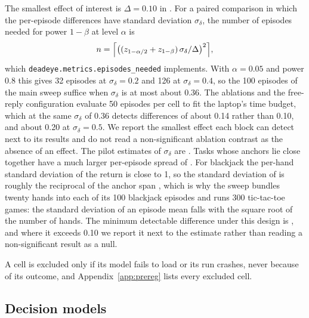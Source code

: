The smallest effect of interest is $\Delta=0.10$ in \norm{}. For a paired comparison in which the per-episode differences have standard deviation $\sigma_\delta$, the number of episodes needed for power $1-\beta$ at level $\alpha$ is
\begin{equation}
\label{eq:power}
n = \Bigl\lceil \bigl((z_{1-\alpha/2}+z_{1-\beta})\,\sigma_\delta/\Delta\bigr)^2 \Bigr\rceil,
\end{equation}
which \texttt{deadeye.metrics.episodes\_needed} implements. With $\alpha=0.05$ and power 0.8 this gives 32 episodes at $\sigma_\delta=0.2$ and 126 at $\sigma_\delta=0.4$, so the 100 episodes of the main sweep suffice when $\sigma_\delta$ is at most about 0.36. The ablations and the free-reply configuration evaluate 50 episodes per cell to fit the laptop's time budget, which at the same $\sigma_\delta$ of 0.36 detects differences of about 0.14 rather than 0.10, and about 0.20 at $\sigma_\delta=0.5$. We report the smallest effect each block can detect next to its results and do not read a non-significant ablation contrast as the absence of an effect. The pilot estimates of $\sigma_\delta$ are . Tasks whose anchors lie close together have a much larger per-episode spread of \norm{}. For blackjack the per-hand standard deviation of the return is close to 1, so the standard deviation of \norm{} is roughly the reciprocal of the anchor span , which is why the sweep bundles twenty hands into each of its 100 blackjack episodes and runs 300 tic-tac-toe games: the standard deviation of an episode mean falls with the square root of the number of hands. The minimum detectable difference under this design is , and where it exceeds 0.10 we report it next to the estimate rather than reading a non-significant result as a null.

A cell is excluded only if its model fails to load or its run crashes, never because of its outcome, and Appendix~\ref{app:prereg} lists every excluded cell.

\subsection{Decision models}
\label{sec:setup:decision}

